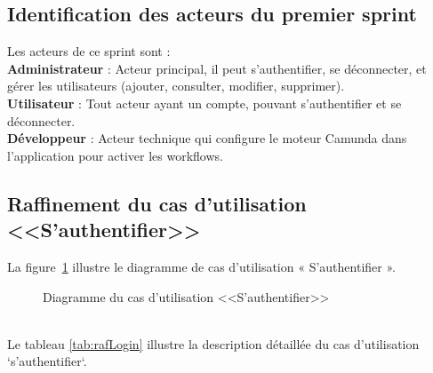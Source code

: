 \subsection{Identification des acteurs du premier sprint}
Les acteurs de ce sprint sont : \\
\textbf{Administrateur} : Acteur principal, il peut s’authentifier, se déconnecter, et gérer les utilisateurs (ajouter, consulter, modifier, supprimer). \\
\textbf{Utilisateur} : Tout acteur ayant un compte, pouvant s’authentifier et se déconnecter. \\
\textbf{Développeur} : Acteur technique qui configure le moteur Camunda dans l’application pour activer les workflows.

\subsection{Raffinement du cas d'utilisation <<S'authentifier>>}
La figure~\ref{fig:auth_diagram} illustre le diagramme de cas d’utilisation « S’authentifier ».
\begin{figure}[h]
     \centering
     \caption{Diagramme du cas d'utilisation <<S'authentifier>>}
     \label{fig:auth_diagram}
\end{figure}\\
Le tableau \ref{tab:rafLogin} illustre la description détaillée du cas d'utilisation `s’authentifier`.
